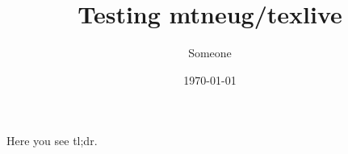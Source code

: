 \documentclass{article}
\title{Testing mtneug/texlive}
\author{Someone}
\date{\today}
\begin{document}
  \maketitle
  \clearpage

  \printglossary[type=\acronymtype]
  \clearpage

  Here you see \citep{Someone2016} \acrfull{tl;dr}.
  \clearpage

  
  
\end{document}
